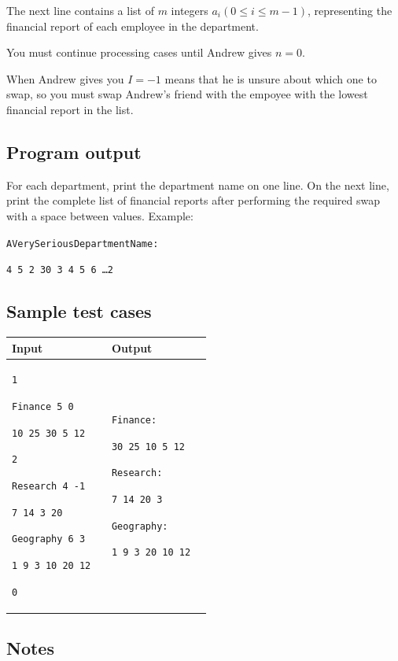 \documentclass[11pt,a4paper]{article}
\newenvironment{sample}[2]{
  \begin{tcolorbox}[title=Prueba \##1, colback=white, colframe=black, sharp corners,
    fonttitle=\bfseries, breakable]
    \begin{tabular}{|p{0.45\linewidth}|p{0.45\linewidth}|}
      \hline
      \textbf{Input} & \textbf{Output} \\
      \hline
      }{\\ \hline
    \end{tabular}
  \end{tcolorbox}
}
\begin{document}
The next line contains a list of \(m\) integers \(a_i (0 \leq i \leq m-1)\), representing the financial report of each employee in the department.

You must continue processing cases until Andrew gives \(n = 0\).

When Andrew gives you \(I = -1\) means that he is unsure about which one to swap, so you must swap Andrew's friend with the empoyee with the lowest financial report in the list. 

\subsection*{Program output}

For each department, print the department name on one line. On the next line, print the complete list of financial reports after performing the required swap with a space between values. Example:

\texttt{AVerySeriousDepartmentName:}

\texttt{4 5 2 30 3 4 5 6 \dots 2}

\subsection*{Sample test cases}

\begin{sample}{1}{}
\texttt{1}

\texttt{Finance 5 0}

\texttt{10 25 30 5 12}

\texttt{2}

\texttt{Research 4 -1}

\texttt{7 14 3 20}

\texttt{Geography 6 3}

\texttt{1 9 3 10 20 12}

\texttt{0}
&
\texttt{Finance:}

\texttt{30 25 10 5 12}

\texttt{Research:}

\texttt{7 14 20 3}

\texttt{Geography:}

\texttt{1 9 3 20 10 12}

\end{sample}
 

\subsection*{Notes}
\end{document}
